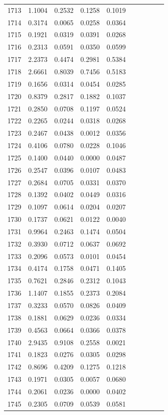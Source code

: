 \begin{table}
\begin{tabular}{cccccccccc}
1713& 1.1004& 0.2532& 0.1258& 0.1019\\ 
1714& 0.3174& 0.0065& 0.0258& 0.0364\\ 
1715& 0.1921& 0.0319& 0.0391& 0.0268\\ 
1716& 0.2313& 0.0591& 0.0350& 0.0599\\ 
1717& 2.2373& 0.4474& 0.2981& 0.5384\\ 
1718& 2.6661& 0.8039& 0.7456& 0.5183\\ 
1719& 0.1656& 0.0314& 0.0454& 0.0285\\ 
1720& 0.8379& 0.2817& 0.1882& 0.1037\\ 
1721& 0.2850& 0.0708& 0.1197& 0.0524\\ 
1722& 0.2265& 0.0244& 0.0318& 0.0268\\ 
1723& 0.2467& 0.0438& 0.0012& 0.0356\\ 
1724& 0.4106& 0.0780& 0.0228& 0.1046\\ 
1725& 0.1400& 0.0440& 0.0000& 0.0487\\ 
1726& 0.2547& 0.0396& 0.0107& 0.0483\\ 
1727& 0.2684& 0.0705& 0.0331& 0.0370\\ 
1728& 0.1392& 0.0402& 0.0449& 0.0316\\ 
1729& 0.1097& 0.0614& 0.0204& 0.0207\\ 
1730& 0.1737& 0.0621& 0.0122& 0.0040\\ 
1731& 0.9964& 0.2463& 0.1474& 0.0504\\ 
1732& 0.3930& 0.0712& 0.0637& 0.0692\\ 
1733& 0.2096& 0.0573& 0.0101& 0.0454\\ 
1734& 0.4174& 0.1758& 0.0471& 0.1405\\ 
1735& 0.7621& 0.2846& 0.2312& 0.1043\\ 
1736& 1.1407& 0.1855& 0.2373& 0.2084\\ 
1737& 0.3233& 0.0570& 0.0826& 0.0409\\ 
1738& 0.1881& 0.0629& 0.0236& 0.0334\\ 
1739& 0.4563& 0.0664& 0.0366& 0.0378\\ 
1740& 2.9435& 0.9108& 0.2558& 0.0021\\ 
1741& 0.1823& 0.0276& 0.0305& 0.0298\\ 
1742& 0.8696& 0.4209& 0.1275& 0.1218\\ 
1743& 0.1971& 0.0305& 0.0057& 0.0680\\ 
1744& 0.2061& 0.0236& 0.0000& 0.0402\\ 
1745& 0.2305& 0.0709& 0.0539& 0.0581\\ 

\end{tabular}
\end{table}
